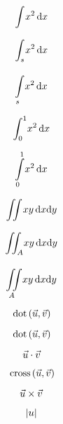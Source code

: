 \documentclass{article}
\begin{document}
\begin{equation}
  \integral{x^2}{x}
\end{equation}

\begin{equation}
  \integral[s]{x^2}{x}
\end{equation}

\begin{equation}
  \integral*[s]{x^2}{x}
\end{equation}

\begin{equation}
  \integral[0][1]{x^2}{x}
\end{equation}

\begin{equation}
  \integral*[0][1]{x^2}{x}
\end{equation}

\begin{equation}
  \iintegral{xy}{x}{y}
\end{equation}

\begin{equation}
  \iintegral[A]{xy}{x}{y}
\end{equation}

\begin{equation}
  \iintegral*[A]{xy}{x}{y}
\end{equation}

\begin{equation}
  \, \mathrm{dot} \left( {\vec u, \vec v} \right)
\end{equation}

\begin{equation}
  \, \mathrm{dot} \left( {\vec u, \vec v} \right)
\end{equation}

\begin{equation}
  \vec u \cdot \vec v
\end{equation}

\begin{equation}
  \, \mathrm{cross} \left( {\vec u, \vec v} \right)
\end{equation}

\begin{equation}
  \vec u \times \vec v
\end{equation}

\begin{equation}
  \left\lvert u \right\rvert
\end{equation}
\end{document}
